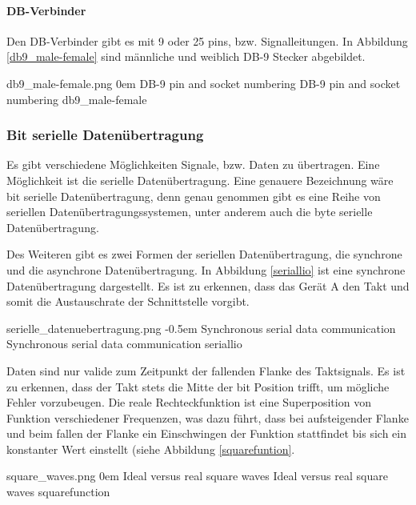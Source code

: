 \paragraph{DB-Verbinder} Den DB-Verbinder gibt es mit 9 oder 25 pins, bzw. Signalleitungen. In Abbildung \ref{db9_male-female} sind männliche und weiblich DB-9 Stecker abgebildet.

{db9_male-female.png}
{0em}
{DB-9 pin and socket numbering}
{DB-9 pin and socket numbering \cite[S. 211]{hughes2010real}}
{db9_male-female}



\subsubsection{Bit serielle Datenübertragung}

Es gibt verschiedene Möglichkeiten Signale, bzw. Daten zu übertragen. Eine Möglichkeit ist die serielle Datenübertragung. Eine genauere Bezeichnung wäre bit serielle Datenübertragung, denn genau genommen gibt es eine Reihe von seriellen Datenübertragungssystemen, unter anderem auch die byte serielle Datenübertragung. 


Des Weiteren gibt es zwei Formen der seriellen Datenübertragung, die synchrone und die asynchrone Datenübertragung. In Abbildung \ref{seriallio} ist eine synchrone Datenübertragung dargestellt. Es ist zu erkennen, dass das Gerät A den Takt und somit die Austauschrate der Schnittstelle vorgibt.

{serielle_datenuebertragung.png}
{-0.5em}
{Synchronous serial data communication}
{Synchronous serial data communication \cite[S. 52]{hughes2010real}}
{seriallio}

Daten sind nur valide zum Zeitpunkt der fallenden Flanke des Taktsignals. Es ist zu erkennen, dass der Takt stets die Mitte der bit Position trifft, um mögliche Fehler vorzubeugen. Die \glqq reale\grqq{} Rechteckfunktion ist eine Superposition von Funktion verschiedener Frequenzen, was dazu führt, dass bei aufsteigender Flanke und beim fallen der Flanke ein Einschwingen der Funktion stattfindet bis sich ein konstanter Wert einstellt (siehe Abbildung \ref{squarefuntion}.

{square_waves.png}
{0em}
{Ideal versus real square waves}
{Ideal versus real square waves \cite[S. 5]{hughes2010real}}
{squarefunction}


